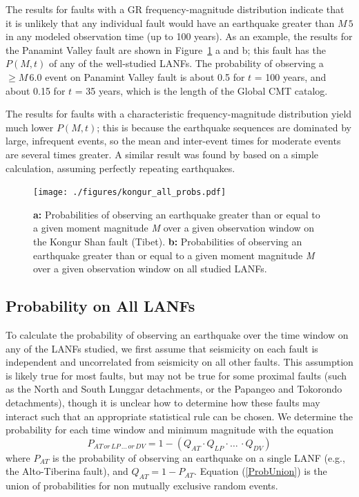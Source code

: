 \documentclass[twocolumn,grl]{AGUTeX}
\begin{document}
\begin{article}
The results for faults with a GR frequency-magnitude distribution
indicate that it is unlikely that any individual fault would have an earthquake
greater than $M \, 5$ in any modeled observation time (up to 100 years).  
As an example, the results for the Panamint Valley fault are shown in
Figure~\ref{fig:kongur_all_probs} a and b;
this fault has the $P(M,t)$ of any of the well-studied LANFs.  The
probability of observing a $\ge M \, 6.0$ event on Panamint Valley fault 
is about 0.5 for $t$ = 100 years, and about 0.15 for $t$ = 35 years, which is
the length of the Global CMT catalog. 

The results for faults with a characteristic frequency-magnitude distribution
yield much lower $P(M,t)$; this is because the earthquake sequences are 
dominated by large, infrequent events, so the mean and inter-event times for
moderate events are several times greater. A similar result was found by
\citep{wernicke1995seis} based on a simple calculation, assuming perfectly
repeating earthquakes.
 
\begin{figure}[t!]
\noindent\texttt{[image: ./figures/kongur\_all\_probs.pdf]}
\caption{\textbf{a:} Probabilities of observing an earthquake greater than or equal to a given moment magnitude \emph{M} over a given observation window on the Kongur Shan fault (Tibet). \textbf{b:} Probabilities of observing an earthquake greater than or equal to a given moment magnitude \emph{M} over a given observation window on all studied LANFs. }
\label{fig:kongur_all_probs}
\end{figure}

\subsection{Probability on All LANFs}
To calculate the probability of observing an earthquake over the time
window on any of the LANFs studied, we first assume that seismicity on
each fault is independent and uncorrelated from seismicity on all
other faults. This assumption is likely true for most faults, but may
not be true for some proximal faults (such as the North and South
Lunggar detachments, or the Papangeo and Tokorondo detachments),
though it is unclear how to determine how these faults may interact 
such that an appropriate statistical rule can be chosen.  We
determine the probability for each time window and minimum magnitude
with the equation
\begin{equation}
P_{AT \, or \, LP\, \ldots \, or \, DV} = 1 - (Q_{AT} \cdot Q_{LP} \cdot \ldots \, \cdot Q_{DV})
\label{ProbUnion}
\end{equation}
where $P_{AT}$ is the probability of observing an earthquake on a
single LANF (e.g., the Alto-Tiberina fault), and $Q_{AT} = 1 -
P_{AT}$. Equation (\ref{ProbUnion}) is the union of probabilities for
non mutually exclusive random events.


\end{article}
\end{document}
